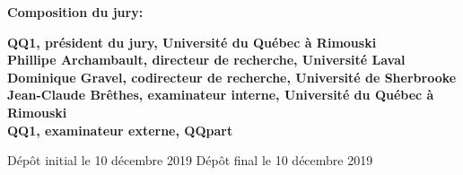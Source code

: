 \thispagestyle{empty}

\null
\vfill
\noindent \textbf{Composition du jury:}\\
\vspace{1cm}

\begin{singlespace}
  \noindent \textbf{QQ1, président du jury, Université du Québec à Rimouski}\\

  \noindent \textbf{Phillipe Archambault, directeur de recherche, Université Laval}\\

  \noindent \textbf{Dominique Gravel, codirecteur de recherche, Université de Sherbrooke}\\

  \noindent \textbf{Jean-Claude Brêthes, examinateur interne, Université du Québec à Rimouski}\\

  \noindent \textbf{QQ1, examinateur externe, QQpart}\\
\end{singlespace}

\vspace{2cm}
\noindent Dépôt initial le 10 décembre 2019
\hspace{3cm}
Dépôt final le 10 décembre 2019


\cleardoublepage
